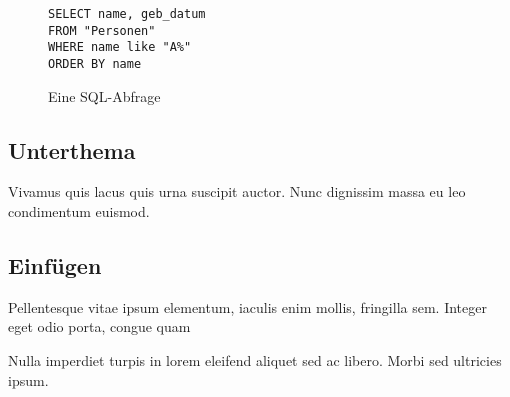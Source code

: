 \begin{figure}[t]
\lstset{numbers=left, stepnumber=1}
\begin{lstlisting}[firstnumber = 1]
SELECT name, geb_datum
FROM "Personen"
WHERE name like "A%"
ORDER BY name
\end{lstlisting}
\caption{\label{listing:sql-abfrage1}Eine SQL-Abfrage}
\end{figure}

\subsection{Unterthema}

Vivamus quis lacus quis urna suscipit auctor. Nunc dignissim massa eu leo condimentum euismod. 

\subsection{Einfügen}


Pellentesque vitae ipsum elementum, iaculis enim mollis, fringilla sem. Integer eget odio porta, congue quam 


Nulla imperdiet turpis in lorem eleifend aliquet sed ac libero. Morbi sed ultricies ipsum. 
